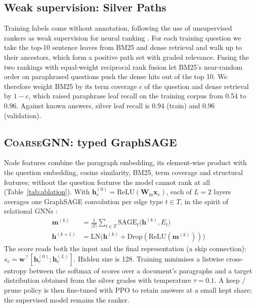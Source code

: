 \documentclass[11pt]{article}
\newcommand{\coarse}{\textsc{CoarseGNN}}
\begin{document}
\subsection{Weak supervision: Silver Paths}
Training labels come without annotation, following the use of unsupervised rankers as weak supervision for neural ranking \citep{dehghani2017weak}. For each training question we take the top-10 sentence leaves from BM25 \citep{robertson2009bm25} and dense retrieval and walk up to their ancestors, which form a positive path set with graded relevance. Fusing the two rankings with equal-weight reciprocal rank fusion \citep{cormack2009rrf} let BM25's near-random order on paraphrased questions push the dense hits out of the top 10. We therefore weight BM25 by its term coverage $c$ of the question and dense retrieval by $1-c$, which raised paraphrase leaf recall on the training corpus from 0.54 to 0.96. Against known answers, silver leaf recall is 0.94 (train) and 0.96 (validation).

\subsection{\coarse{}: typed GraphSAGE}
Node features combine the paragraph embedding, its element-wise product with the question embedding, cosine similarity, BM25, term coverage and structural features; without the question features the model cannot rank at all (Table~\ref{tab:ablation}). With $\mathbf{h}^{(0)}_v = \mathrm{ReLU}(\mathbf{W}_{\mathrm{in}}\mathbf{x}_v)$, each of $L{=}2$ layers averages one GraphSAGE convolution \citep{hamilton2017graphsage} per edge type $t \in T$, in the spirit of relational GNNs \citep{schlichtkrull2018rgcn}:
\begin{align}
\mathbf{m}^{(k)} &= \tfrac{1}{|T|}\textstyle\sum_{t\in T}\mathrm{SAGE}_t\big(\mathbf{h}^{(k)}, E_t\big)\\
\mathbf{h}^{(k+1)} &= \mathrm{LN}\big(\mathbf{h}^{(k)} + \mathrm{Drop}(\mathrm{ReLU}(\mathbf{m}^{(k)}))\big)
\end{align}
The score reads both the input and the final representation (a skip connection): $s_v = \mathbf{w}^\top[\mathbf{h}^{(0)}_v; \mathbf{h}^{(L)}_v]$. Hidden size is 128. Training minimises a listwise cross-entropy \citep{cao2007listnet} between the softmax of scores over a document's paragraphs and a target distribution obtained from the silver grades with temperature $\tau{=}0.1$. A keep / prune policy is then fine-tuned with PPO \citep{schulman2017ppo} to retain answers at a small kept share; the supervised model remains the ranker.
\end{document}
